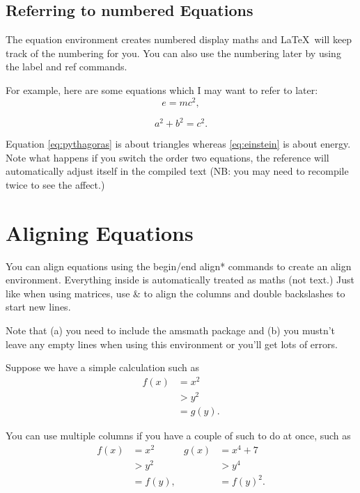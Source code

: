 \documentclass[a4paper,11pt]{article}
\begin{document}
\subsection{Referring to numbered Equations}

The equation environment creates numbered display maths and \LaTeX \, will keep track of the numbering for you. You can also use the numbering later by using the label and ref commands.

For example, here are some equations which I may want to refer to later:
\begin{equation}\label{eq:einstein}
e=mc^2,
\end{equation}

\begin{equation}\label{eq:pythagoras}
a^2+b^2=c^2.
\end{equation}

Equation \ref{eq:pythagoras} is about triangles whereas \eqref{eq:einstein} %
is about energy. Note what happens if you switch the order two equations, the reference will automatically adjust itself in the compiled text (NB: you may need to recompile twice to see the affect.) 

\section{Aligning Equations}

You can align equations using the begin/end align* commands to create an align environment. Everything inside is automatically treated as maths (not text.) Just like when using matrices, use \& to align the columns and double backslashes to start new lines. 

Note that (a) you need to include the amsmath package and (b) you mustn't leave any empty lines when using this environment or you'll get lots of errors.

Suppose we have a simple calculation such as 
\begin{align*} 
f(x) & = x^2 \\
     & > y^2 \\
     & = g(y).
\end{align*}

You can use multiple columns if you have a couple of such to do at once, such as
\begin{align*} 
f(x) & = x^2     & g(x) & = x^4 +7 \\
     & > y^2     &      & > y^4    \\
     & = f(y),   &      & = f(y)^2. \\
\end{align*}
\end{document}
